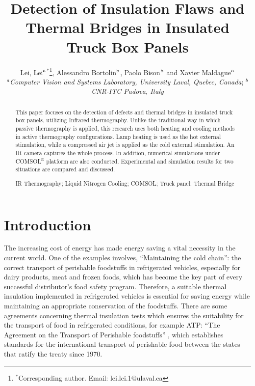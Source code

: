 \documentclass{tQRT2e}
\begin{document}


\title{Detection of Insulation Flaws and Thermal Bridges in Insulated Truck Box Panels}

\author{Lei, Lei$^{\rm a}$$^{\ast}$\thanks{$^\ast$Corresponding author. Email: lei.lei.1@ulaval.ca
\vspace{6pt}},  Alessandro Bortolin$^{\rm b}$, Paolo Bison$^{\rm b}$ and Xavier Maldague$^{\rm a}$\\\vspace{6pt}  $^{a}${\em{Computer Vision and Systems Laboratory, University Laval, Quebec, Canada}};
$^{b}${\em{CNR-ITC Padova, Italy}} \\\received{}}

\maketitle

\begin{abstract}
This paper focuses on the detection of defects and thermal bridges in insulated truck box panels, utilizing Infrared thermography. Unlike the traditional way in which passive thermography is applied, this research uses both heating and cooling methods in active thermography configurations. Lamp heating is used as the hot external stimulation, while a compressed air jet is applied as the cold external stimulation. An IR camera captures the whole process. In addition, numerical simulations under COMSOL$^®$ platform are also conducted. Experimental and simulation results for two situations are compared and discussed.

\begin{keywords}IR Thermography; Liquid Nitrogen Cooling;
COMSOL; Truck panel; Thermal Bridge
\end{keywords}

\end{abstract}


\section{Introduction}

The increasing cost of energy has made energy saving a vital necessity in the current world. One of the examples involves, “Maintaining the cold chain”: the correct transport of perishable foodstuffs in refrigerated vehicles, especially for dairy products, meat and frozen foods, which has become the key part of every successful distributor’s food safety program. Therefore, a suitable thermal insulation implemented in refrigerated vehicles is essential for saving energy while maintaining an appropriate conservation of the foodstuffs. There are some agreements concerning thermal insulation tests which ensures the suitability for the transport of food in refrigerated conditions, for example ATP: “The Agreement on the Transport of Perishable foodstuffs” \cite{Geneva1970}, which establishes standards for the international transport of perishable food between the states that ratify the treaty since 1970.
\end{document}
